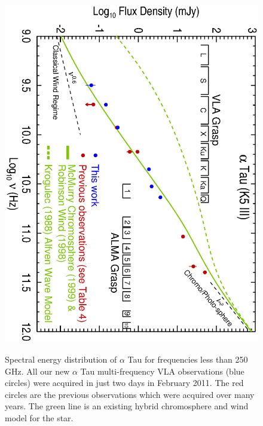 \documentclass[iop]{emulateapj}
\begin{document}
\begin{figure}
\includegraphics[trim = 0mm 0mm 0mm 20mm, clip,scale=0.65, angle=90]{fig2.ps}
\\
\caption{Spectral energy distribution of $\alpha$ Tau for frequencies less than 250 GHz. All our new $\alpha$ Tau multi-frequency VLA observations (blue circles) were acquired in just two days in February 2011. The red circles are the previous observations which were acquired over many years. The green line is an existing hybrid chromosphere and wind model for the star.}
\label{fig:fig2}
\end{figure}
\end{document}
